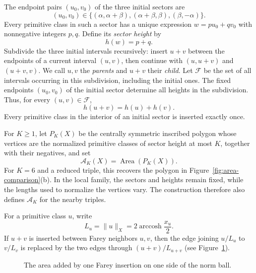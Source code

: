 \documentclass[10pt,twoside]{article}
\theoremstyle{plain}
\theoremstyle{definition}
\theoremstyle{remark}
\DeclareMathOperator{\Area}{Area}
\DeclareMathOperator{\arccosh}{arccosh}
\newcommand{\A}{\mathcal A}
\begin{document}
The endpoint pairs $(u_0,v_0)$ of the three initial sectors are
$$
(u_0,v_0)\in
\{(\alpha,\alpha+\beta),(\alpha+\beta,\beta),(\beta,-\alpha)\}.
$$
Every primitive class in such a sector has a unique expression
$w=pu_0+qv_0$ with nonnegative integers $p,q$. Define its
\emph{sector height} by
$$
h(w)=p+q.
$$
Subdivide the three initial intervals recursively: insert $u+v$
between the endpoints of a current interval $(u,v)$, then continue
with $(u,u+v)$ and $(u+v,v)$. We call $u,v$ the \emph{parents}
and $u+v$ their \emph{child}.
Let $\mathscr F$ be the set of all intervals occurring in this
subdivision, including the initial ones.
The fixed endpoints $(u_0,v_0)$ of the initial sector determine
all heights in the subdivision.
Thus, for every $(u,v)\in\mathscr F$,
$$
h(u+v)=h(u)+h(v).
$$
Every primitive class in the interior of an initial sector is
inserted exactly once.

For $K\geq1$, let $P_K(X)$ be the centrally symmetric inscribed polygon
whose vertices are the normalized primitive classes of sector height at
most $K$, together with their negatives, and set
$$
\A_K(X)=\Area(P_K(X)).
$$
For $K=6$ and a reduced triple, this recovers the polygon in
Figure~\ref{fig:area-comparison}(b). In the local family, the sectors
and heights remain fixed, while the lengths used to normalize the
vertices vary. The construction therefore also defines $\A_K$
for the nearby triples.

For a primitive class $u$, write
$$
L_u=\|u\|_X=2\arccosh\frac{x_u}{2}.
$$
If $u+v$ is inserted between Farey neighbors $u,v$, then the edge joining
$u/L_u$ to $v/L_v$ is replaced by the two edges through
$(u+v)/L_{u+v}$ (see Figure~\ref{fig:area-correction}). 
\begin{figure}[ht]
\centering
{}
\caption{The area added by one Farey insertion on one side of the norm ball.}
\label{fig:area-correction}
\end{figure}
\end{document}
